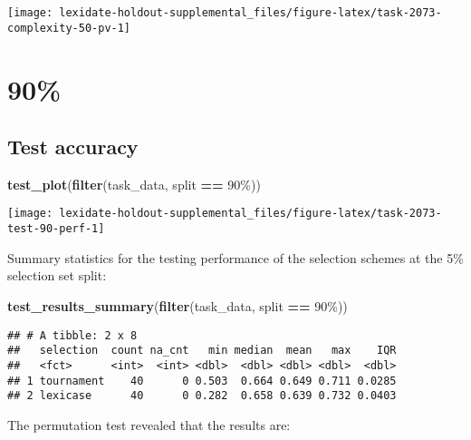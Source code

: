 \documentclass[
]{book}
\newenvironment{Shaded}{\begin{snugshade}}{\end{snugshade}}
\newcommand{\FunctionTok}[1]{\textcolor[rgb]{0.13,0.29,0.53}{\textbf{#1}}}
\newcommand{\NormalTok}[1]{#1}
\newcommand{\SpecialCharTok}[1]{\textcolor[rgb]{0.81,0.36,0.00}{\textbf{#1}}}
\newcommand{\StringTok}[1]{\textcolor[rgb]{0.31,0.60,0.02}{#1}}
\begin{document}
\texttt{[image: lexidate-holdout-supplemental\_files/figure-latex/task-2073-complexity-50-pv-1]}

\hypertarget{section-43}{%
\section{90\%}\label{section-43}}

\hypertarget{test-accuracy-43}{%
\subsection{Test accuracy}\label{test-accuracy-43}}

\begin{Shaded}
\begin{Highlighting}[]
\FunctionTok{test\_plot}\NormalTok{(}\FunctionTok{filter}\NormalTok{(task\_data, split }\SpecialCharTok{==} \StringTok{\textquotesingle{}90\%\textquotesingle{}}\NormalTok{))}
\end{Highlighting}
\end{Shaded}

\texttt{[image: lexidate-holdout-supplemental\_files/figure-latex/task-2073-test-90-perf-1]}

Summary statistics for the testing performance of the selection schemes at the 5\% selection set split:

\begin{Shaded}
\begin{Highlighting}[]
\FunctionTok{test\_results\_summary}\NormalTok{(}\FunctionTok{filter}\NormalTok{(task\_data, split }\SpecialCharTok{==} \StringTok{\textquotesingle{}90\%\textquotesingle{}}\NormalTok{))}
\end{Highlighting}
\end{Shaded}

\begin{verbatim}
## # A tibble: 2 x 8
##   selection  count na_cnt   min median  mean   max    IQR
##   <fct>      <int>  <int> <dbl>  <dbl> <dbl> <dbl>  <dbl>
## 1 tournament    40      0 0.503  0.664 0.649 0.711 0.0285
## 2 lexicase      40      0 0.282  0.658 0.639 0.732 0.0403
\end{verbatim}

The permutation test revealed that the results are:
\end{document}
